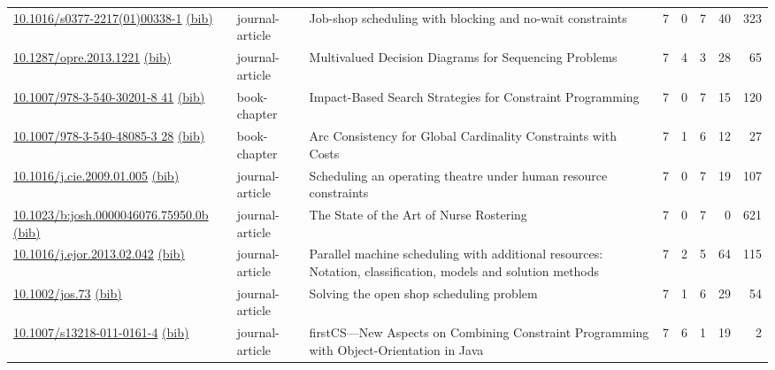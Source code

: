 {\begin{longtable}{p{5cm}lp{11cm}rrrrr}
\href{http://dx.doi.org/10.1016/s0377-2217(01)00338-1}{10.1016/s0377-2217(01)00338-1} \href{https://www.doi2bib.org/bib/10.1016/s0377-2217(01)00338-1}{(bib)} & journal-article & Job-shop scheduling with blocking and no-wait constraints & 7 & 0 & 7 & 40 & 323 \\
\href{http://dx.doi.org/10.1287/opre.2013.1221}{10.1287/opre.2013.1221} \href{https://www.doi2bib.org/bib/10.1287/opre.2013.1221}{(bib)} & journal-article & Multivalued Decision Diagrams for Sequencing Problems & 7 & 4 & 3 & 28 & 65 \\
\href{http://dx.doi.org/10.1007/978-3-540-30201-8_41}{10.1007/978-3-540-30201-8 41} \href{https://www.doi2bib.org/bib/10.1007/978-3-540-30201-8_41}{(bib)} & book-chapter & Impact-Based Search Strategies for Constraint Programming & 7 & 0 & 7 & 15 & 120 \\
\href{http://dx.doi.org/10.1007/978-3-540-48085-3_28}{10.1007/978-3-540-48085-3 28} \href{https://www.doi2bib.org/bib/10.1007/978-3-540-48085-3_28}{(bib)} & book-chapter & Arc Consistency for Global Cardinality Constraints with Costs & 7 & 1 & 6 & 12 & 27 \\
\href{http://dx.doi.org/10.1016/j.cie.2009.01.005}{10.1016/j.cie.2009.01.005} \href{https://www.doi2bib.org/bib/10.1016/j.cie.2009.01.005}{(bib)} & journal-article & Scheduling an operating theatre under human resource constraints & 7 & 0 & 7 & 19 & 107 \\
\href{http://dx.doi.org/10.1023/b:josh.0000046076.75950.0b}{10.1023/b:josh.0000046076.75950.0b} \href{https://www.doi2bib.org/bib/10.1023/b:josh.0000046076.75950.0b}{(bib)} & journal-article & The State of the Art of Nurse Rostering & 7 & 0 & 7 & 0 & 621 \\
\href{http://dx.doi.org/10.1016/j.ejor.2013.02.042}{10.1016/j.ejor.2013.02.042} \href{https://www.doi2bib.org/bib/10.1016/j.ejor.2013.02.042}{(bib)} & journal-article & Parallel machine scheduling with additional resources: Notation, classification, models and solution methods & 7 & 2 & 5 & 64 & 115 \\
\href{http://dx.doi.org/10.1002/jos.73}{10.1002/jos.73} \href{https://www.doi2bib.org/bib/10.1002/jos.73}{(bib)} & journal-article & Solving the open shop scheduling problem & 7 & 1 & 6 & 29 & 54 \\
\href{http://dx.doi.org/10.1007/s13218-011-0161-4}{10.1007/s13218-011-0161-4} \href{https://www.doi2bib.org/bib/10.1007/s13218-011-0161-4}{(bib)} & journal-article & firstCS—New Aspects on Combining Constraint Programming with Object-Orientation in Java & 7 & 6 & 1 & 19 & 2 \\

\end{longtable}}
